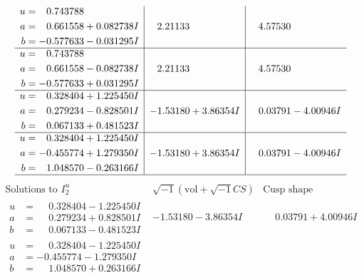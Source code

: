 \documentclass[1p]{elsarticle_modified}
\theoremstyle{definition}
\newcommand{\I}{\sqrt{-1}}
\begin{document}
$$\begin{array}{c|c|c}
\begin{aligned}
u &= \phantom{-}0.743788\phantom{ +0.000000I} \\
a &= \phantom{-}0.661558 + 0.082738 I \\
b &= -0.577633 - 0.031295 I\end{aligned}
 & \phantom{-}2.21133\phantom{ +0.000000I} & \phantom{-}4.57530\phantom{ +0.000000I} \\ \hline\begin{aligned}
u &= \phantom{-}0.743788\phantom{ +0.000000I} \\
a &= \phantom{-}0.661558 - 0.082738 I \\
b &= -0.577633 + 0.031295 I\end{aligned}
 & \phantom{-}2.21133\phantom{ +0.000000I} & \phantom{-}4.57530\phantom{ +0.000000I} \\ \hline\begin{aligned}
u &= \phantom{-}0.328404 + 1.225450 I \\
a &= \phantom{-}0.279234 - 0.828501 I \\
b &= \phantom{-}0.067133 + 0.481523 I\end{aligned}
 & -1.53180 + 3.86354 I & \phantom{-}0.03791 - 4.00946 I \\ \hline\begin{aligned}
u &= \phantom{-}0.328404 + 1.225450 I \\
a &= -0.455774 + 1.279350 I \\
b &= \phantom{-}1.048570 - 0.263166 I\end{aligned}
 & -1.53180 + 3.86354 I & \phantom{-}0.03791 - 4.00946 I\\
 \hline 
 \end{array}$$\newpage$$\begin{array}{c|c|c}  
\text{Solutions to }I^u_{2}& \I (\text{vol} + \sqrt{-1}CS) & \text{Cusp shape}\\
 \hline 
\begin{aligned}
u &= \phantom{-}0.328404 - 1.225450 I \\
a &= \phantom{-}0.279234 + 0.828501 I \\
b &= \phantom{-}0.067133 - 0.481523 I\end{aligned}
 & -1.53180 - 3.86354 I & \phantom{-}0.03791 + 4.00946 I \\ \hline\begin{aligned}
u &= \phantom{-}0.328404 - 1.225450 I \\
a &= -0.455774 - 1.279350 I \\
b &= \phantom{-}1.048570 + 0.263166 I\end{aligned}

\end{array}$$
\end{document}
